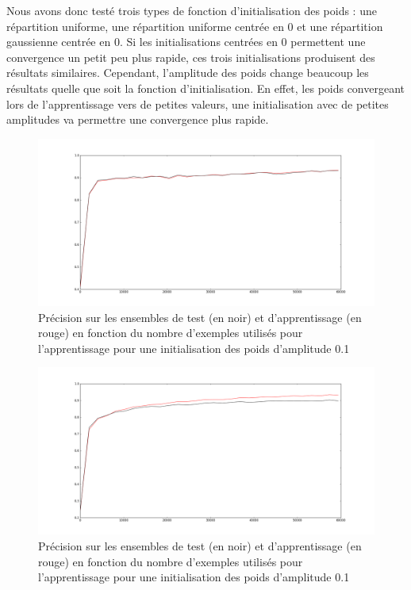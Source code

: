 \documentclass{report}
\theoremstyle{plain}
\theoremstyle{definition}
\theoremstyle{remark}
\begin{document}
Nous avons donc testé trois types de fonction d'initialisation des poids : une répartition uniforme, une répartition uniforme centrée en 0  et une répartition gaussienne centrée en 0.
Si les initialisations centrées en 0 permettent une convergence un petit peu plus rapide, ces trois initialisations produisent des résultats similaires. Cependant, l'amplitude des poids change beaucoup les résultats quelle que soit la fonction d'initialisation. En effet, les poids convergeant lors de l'apprentissage vers de petites valeurs, une initialisation avec de petites amplitudes va permettre une convergence plus rapide.

\begin{figure}[!h]
\begin{center}
\includegraphics[scale=0.2]{images/initialisationpoids_amplitude01.png}
\caption{Précision sur les ensembles de test (en noir) et d'apprentissage (en rouge) en fonction du nombre d'exemples utilisés pour l'apprentissage pour une initialisation des poids d'amplitude 0.1 }
\label{initialisationpoids_amplitude0.1}
\end{center}
\end{figure}

\begin{figure}[!h]
\begin{center}
\includegraphics[scale=0.2]{images/initialisationpoids_amplitude10.png}
\caption{Précision sur les ensembles de test (en noir) et d'apprentissage (en rouge) en fonction du nombre d'exemples utilisés pour l'apprentissage pour une initialisation des poids d'amplitude 0.1}
\label{initialisationpoids_amplitude10}
\end{center}
\end{figure}
\end{document}
